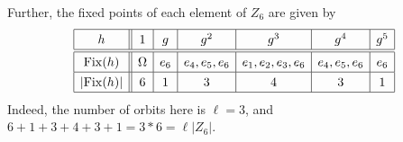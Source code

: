 \documentclass[11pt, reqno]{amsart}
\theoremstyle{plain}
\theoremstyle{definition}
\theoremstyle{example}
\def\Fix{\mathrm{Fix}}
\begin{document}
\begin{enumerate}
Further, the fixed points of each element of $Z_6$ are given by 
$$\def\arraystretch{1.3}\begin{array}{|c||c|c|c|c|c|c|}\hline
h & 1 & g & g^2 & g^3 & g^4 & g^5 \\\hline\hline
\Fix(h) & \Omega & e_6 & e_4, e_5, e_6 & e_1, e_2, e_3, e_6 & e_4, e_5, e_6 & e_6\\\hline
|\Fix(h)| & 6 & 1 & 3 &4 & 3 & 1\\\hline
\end{array}$$
Indeed, the number of orbits here is $\ell = 3$, and $6+1+3+4+3+1 = 3*6 = \ell|Z_6|$. 
\end{enumerate}
\end{document}
